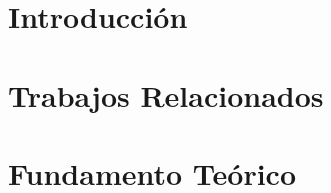 \documentclass[12pt, oneside]{book}
\begin{document}
\frontmatter



\newpage
\thispagestyle{empty}
\null
\clearpage 
	
\newpage
\setcounter{page}{1}


\newpage


\newpage


\newpage


\newpage


\newpage


\newpage
\tableofcontents

\newpage
\listoftables

\newpage
\listoffigures

\newpage


\mainmatter
\chapterformatdefault

\chapter{Introducción}
\thispagestyle{empty}


\chapter{Trabajos Relacionados}
\thispagestyle{empty}


\chapter{Fundamento Teórico}
\thispagestyle{empty}

\end{document}
